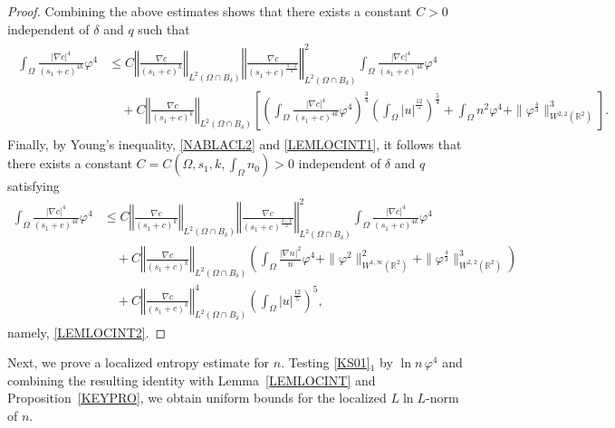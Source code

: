 \documentclass{amsart}
\numberwithin{equation}{section}
\newcommand{\R}{{ \mathbb{R}  }}
\newcommand{\bke}[1]{\left( #1 \right)}
\newcommand{\bkt}[1]{\left[ #1 \right]}
\newcommand{\norm}[1]{\left\Vert #1 \right\Vert}
\begin{document}
\begin{proof}
Combining the above estimates
shows that there exists a constant $C>0$ independent of $\delta$ and $q$ such that
\begin{align*}
\begin{aligned}
 \int_{\Omega}\frac{|\nabla c|^{4}}{(s_{1}+c)^{4k}}\varphi^{4} 
 & \le  C\norm{\frac{\nabla c}{(s_{1}+c)^{k}}}_{L^{2}(\Omega\cap B_{\delta})} \norm{\frac{\nabla c}{(s_{1}+c)^{\frac{3-k}{2}}}}_{L^{2}(\Omega\cap B_{\delta})}^{2}  \int_{\Omega} \frac{|\nabla c|^{4}}{(s_{1}+c)^{4k}}\varphi^{4}
 \\ & \quad +
  C \norm{\frac{\nabla c}{(s_{1}+c)^{k}}}_{L^{2}(\Omega\cap B_{\delta})}   \bkt{ \bke{\int_{\Omega} \frac{|\nabla c|^{4}}{(s_{1}+c)^{4k}}\varphi^{4}}^{\frac{3}{4}}\bke{\int_{\Omega}|u|^{\frac{12}{5}} }^{\frac{5}{4}} + \int_{\Omega}n^{2}\varphi^{4}  +\|\varphi^{\frac{4}{3}}\|_{W^{2,2}(\R^{2})}^{3}}.
\end{aligned}
\end{align*}
Finally, by Young's inequality, \eqref{NABLACL2} and   \eqref{LEMLOCINT1}, it follows that there exists a constant $C=C(\Omega, s_1, k, \int_{\Omega}n_0)>0$ independent of $\delta$ and $q$ satisfying
\[
\begin{aligned}
  \int_{\Omega}\frac{|\nabla c|^{4}}{(s_{1}+c)^{4k}}\varphi^{4} 
 &  \le C\norm{\frac{\nabla c}{(s_{1}+c)^{k}}}_{L^{2}(\Omega\cap B_{\delta})} \norm{\frac{\nabla c}{(s_{1}+c)^{\frac{3-k}{2}}}}_{L^{2}(\Omega\cap B_{\delta})}^{2}  \int_{\Omega} \frac{|\nabla c|^{4}}{(s_{1}+c)^{4k}}\varphi^{4}
 \\&\quad  +   C \norm{\frac{\nabla c}{(s_{1}+c)^{k}}}_{L^{2}(\Omega\cap B_{\delta})}     \bke{  \int_{\Omega} \frac{|\nabla n|^{2}}{n}\varphi^{4}  +\| \varphi^{2}  \|_{W^{1,\infty}(\R^{2})}^{2}  +\|\varphi^{\frac{4}{3}}\|_{W^{2,2}(\R^{2})}^{3}}
 \\&\quad + C \norm{\frac{\nabla c}{(s_{1}+c)^{k}}}^{4}_{L^{2}(\Omega\cap B_{\delta})} \bke{\int_{\Omega}|u|^{\frac{12}{5}} }^{5},
 \end{aligned}
\]
namely, \eqref{LEMLOCINT2}.
\end{proof}


Next, we prove a localized entropy estimate for $n$.
Testing \eqref{KS01}$_1$ by $\ln n\,\varphi^4$ and combining the resulting identity with Lemma~\ref{LEMLOCINT} and Proposition~\ref{KEYPRO}, we obtain uniform bounds for the localized $L\ln L$-norm of $n$.
\end{document}
